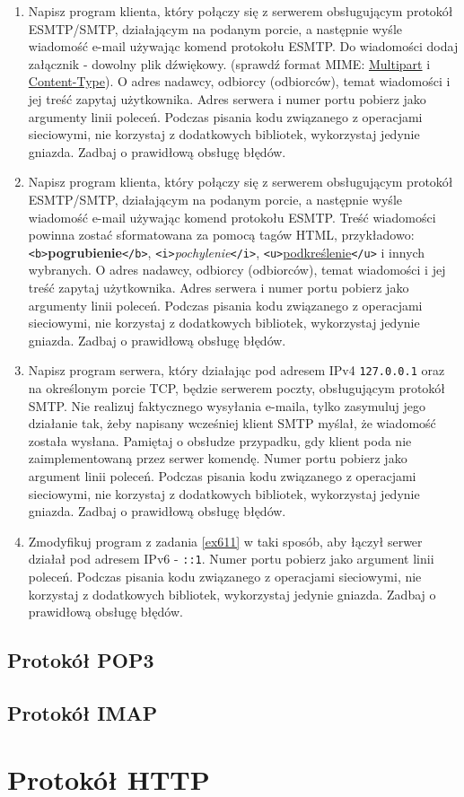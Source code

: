 \documentclass{article}
\begin{document}
\begin{enumerate}[label=\textbf{6.\arabic*}]
\item Napisz program klienta, który połączy się z serwerem obsługującym protokół ESMTP/SMTP, działającym  na podanym porcie, a następnie wyśle wiadomość e-mail używając komend protokołu ESMTP.  Do wiadomości dodaj załącznik - dowolny plik dźwiękowy. (sprawdź format MIME: \href{https://www.w3.org/Protocols/rfc1341/7_2_Multipart.html}{Multipart} i \href{https://www.w3.org/Protocols/rfc1341/7_3_Message.html}{Content-Type}).  O adres nadawcy, odbiorcy (odbiorców), temat wiadomości i jej treść zapytaj użytkownika. Adres serwera i numer portu pobierz jako argumenty linii poleceń. Podczas pisania kodu związanego z operacjami sieciowymi, nie korzystaj z dodatkowych bibliotek, wykorzystaj jedynie gniazda. Zadbaj o prawidłową obsługę błędów.

\item Napisz program klienta, który połączy się z serwerem obsługującym protokół ESMTP/SMTP, działającym  na podanym porcie, a następnie wyśle wiadomość e-mail używając komend protokołu ESMTP. Treść wiadomości powinna zostać sformatowana za pomocą tagów HTML, przykładowo: \texttt{<b>}\textbf{pogrubienie}\texttt{</b>}, \texttt{<i>}\textit{pochylenie}\texttt{</i>}, \texttt{<u>}\underline{podkreślenie}\texttt{</u>} i innych wybranych.   O adres nadawcy, odbiorcy (odbiorców), temat wiadomości i jej treść zapytaj użytkownika. Adres serwera i numer portu pobierz jako argumenty linii poleceń. Podczas pisania kodu związanego z operacjami sieciowymi, nie korzystaj z dodatkowych bibliotek, wykorzystaj jedynie gniazda. Zadbaj o prawidłową obsługę błędów.

\item  \label{ex611} Napisz program serwera, który działając pod adresem IPv4 \texttt{127.0.0.1} oraz na określonym porcie TCP, będzie serwerem poczty, obsługującym protokół SMTP. Nie realizuj faktycznego wysyłania e-maila, tylko zasymuluj jego działanie tak, żeby napisany wcześniej klient SMTP myślał, że wiadomość została wysłana. Pamiętaj o obsłudze przypadku, gdy klient poda nie zaimplementowaną przez serwer komendę. Numer portu pobierz jako argument linii poleceń. Podczas pisania kodu związanego z operacjami sieciowymi, nie korzystaj z dodatkowych bibliotek, wykorzystaj jedynie gniazda. Zadbaj o prawidłową obsługę błędów.

\item  Zmodyfikuj program z zadania \ref{ex611} w taki sposób,  aby łączył serwer działał pod adresem IPv6 - \texttt{::1}. Numer portu pobierz jako argument linii poleceń. Podczas pisania kodu związanego z operacjami sieciowymi, nie korzystaj z dodatkowych bibliotek, wykorzystaj jedynie gniazda. Zadbaj o prawidłową obsługę błędów. 

\end{enumerate}

\subsection*{Protokół POP3}
\subsection*{Protokół IMAP}

\newpage 
\section{Protokół HTTP}

\newpage 

\end{document}

